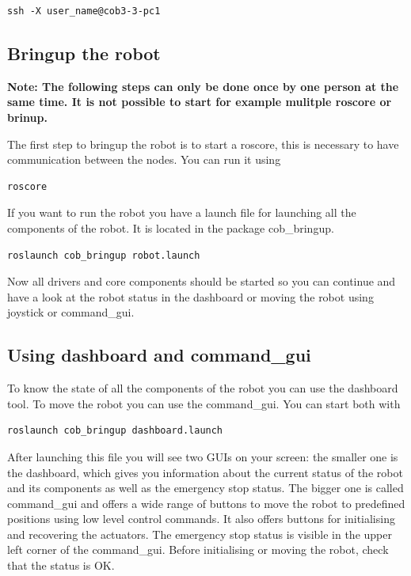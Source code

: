 \begin{lstlisting}
ssh -X user_name@cob3-3-pc1
\end{lstlisting}

\subsection{Bringup the robot}
\textbf{Note: The following steps can only be done once by one person at the same time. It is not possible to start for example mulitple roscore or brinup.}

The first step to bringup the robot is to start a roscore, this is necessary to have communication between the nodes. You can run it using
\begin{lstlisting}
roscore
\end{lstlisting}

If you want to run the robot you have a launch file for launching all the components of the robot. It is located in the package cob\_bringup.
\begin{lstlisting}
roslaunch cob_bringup robot.launch
\end{lstlisting}

Now all drivers and core components should be started so you can continue and have a look at the robot status in the dashboard or moving the robot using joystick or command\_gui.

\subsection{Using dashboard and command\_gui}
To know the state of all the components of the robot you can use the dashboard tool. To move the robot you can use the command\_gui. You can start both with
\begin{lstlisting}
roslaunch cob_bringup dashboard.launch
\end{lstlisting}

After launching this file you will see two GUIs on your screen: the smaller one is the dashboard, which gives you information about the current status of the robot and its components as well as the emergency stop status. The bigger one is called command\_gui and offers a wide range of buttons to move the robot to predefined positions using low level control commands. It also offers buttons for initialising and recovering the actuators. The emergency stop status is visible in the upper left corner of the command\_gui. Before initialising or moving the robot, check that the status is OK.


